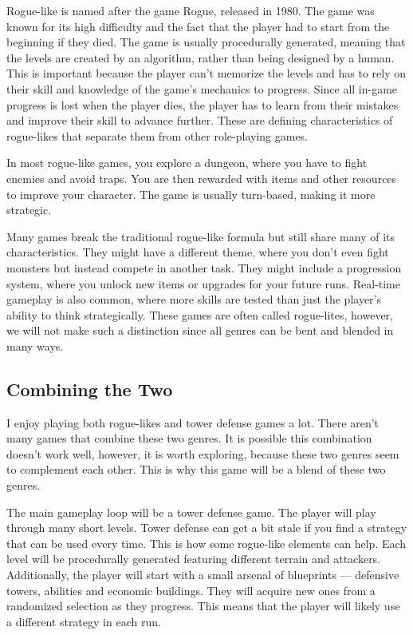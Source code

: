 Rogue-like is named after the game Rogue, released in 1980.
The game was known for its high difficulty and the fact that the player had to start from the beginning if they died.
The game is usually procedurally generated, meaning that the levels are created by an algorithm, rather than being designed by a human.
This is important because the player can't memorize the levels and has to rely on their skill and knowledge of the game's mechanics to progress.
Since all in-game progress is lost when the player dies, the player has to learn from their mistakes and improve their skill to advance further.
These are defining characteristics of rogue-likes that separate them from other role-playing games.

In most rogue-like games, you explore a dungeon, where you have to fight enemies and avoid traps.
You are then rewarded with items and other resources to improve your character.
The game is usually turn-based, making it more strategic.

Many games break the traditional rogue-like formula but still share many of its characteristics.
They might have a different theme, where you don't even fight monsters but instead compete in another task.
They might include a progression system, where you unlock new items or upgrades for your future runs.
Real-time gameplay is also common, where more skills are tested than just the player's ability to think strategically.
These games are often called rogue-lites, however, we will not make such a distinction since all genres can be bent and blended in many ways.

\subsection{Combining the Two}

I enjoy playing both rogue-likes and tower defense games a lot.
There aren't many games that combine these two genres.
It is possible this combination doesn't work well, however, it is worth exploring, because these two genres seem to complement each other.
This is why this game will be a blend of these two genres.

The main gameplay loop will be a tower defense game.
The player will play through many short levels.
Tower defense can get a bit stale if you find a strategy that can be used every time.
This is how some rogue-like elements can help.
Each level will be procedurally generated featuring different terrain and attackers.
Additionally, the player will start with a small arsenal of blueprints --- defensive towers, abilities and economic buildings.
They will acquire new ones from a randomized selection as they progress.
This means that the player will likely use a different strategy in each run.

